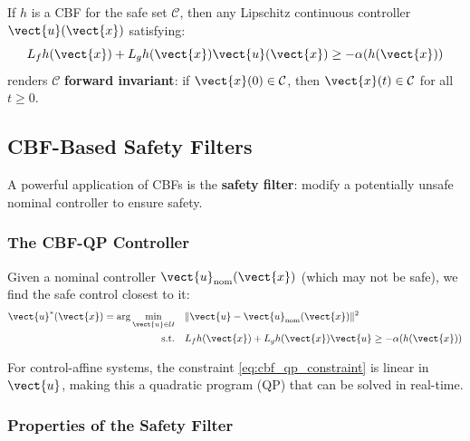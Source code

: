 
\begin{theorem}
\label{thm:cbf_safety}
If $h$ is a CBF for the safe set $\mathcal{C}$, then any Lipschitz continuous controller $\vect{u}(\vect{x})$ satisfying:
\begin{equation}
L_f h(\vect{x}) + L_g h(\vect{x}) \vect{u}(\vect{x}) \geq -\alpha(h(\vect{x}))
\label{eq:cbf_control_condition}
\end{equation}
renders $\mathcal{C}$ \textbf{forward invariant}: if $\vect{x}(0) \in \mathcal{C}$, then $\vect{x}(t) \in \mathcal{C}$ for all $t \geq 0$.
\end{theorem}

\subsection{CBF-Based Safety Filters}

A powerful application of CBFs is the \textbf{safety filter}: modify a potentially unsafe nominal controller to ensure safety.

\subsubsection{The CBF-QP Controller}

Given a nominal controller $\vect{u}_{\text{nom}}(\vect{x})$ (which may not be safe), we find the safe control closest to it:
\begin{align}
\vect{u}^*(\vect{x}) = \arg\min_{\vect{u} \in \mathcal{U}} \quad & \|\vect{u} - \vect{u}_{\text{nom}}(\vect{x})\|^2 \label{eq:cbf_qp_obj}\\
\text{s.t.} \quad & L_f h(\vect{x}) + L_g h(\vect{x}) \vect{u} \geq -\alpha(h(\vect{x})) \label{eq:cbf_qp_constraint}
\end{align}

For control-affine systems, the constraint \eqref{eq:cbf_qp_constraint} is linear in $\vect{u}$, making this a quadratic program (QP) that can be solved in real-time.

\subsubsection{Properties of the Safety Filter}

